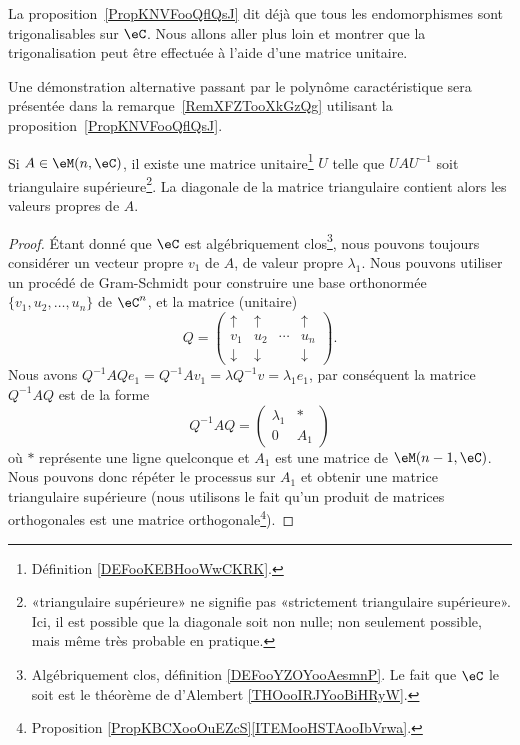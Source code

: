 La proposition~\ref{PropKNVFooQflQsJ} dit déjà que tous les endomorphismes sont trigonalisables sur \( \eC\). Nous allons aller plus loin et montrer que la trigonalisation peut être effectuée à l'aide d'une matrice unitaire.

Une démonstration alternative passant par le polynôme caractéristique sera présentée dans la remarque~\ref{RemXFZTooXkGzQg} utilisant la proposition~\ref{PropKNVFooQflQsJ}.
\begin{lemma}  \label{LemSchurComplHAftTq}
	Si \( A\in\eM(n,\eC)\), il existe une matrice unitaire\footnote{Définition \ref{DEFooKEBHooWwCKRK}.} \( U\) telle que \( UAU^{-1}\) soit triangulaire supérieure\footnote{«triangulaire supérieure» ne signifie pas «strictement triangulaire supérieure». Ici, il est possible que la diagonale soit non nulle; non seulement possible, mais même très probable en pratique.}. La diagonale de la matrice triangulaire contient alors les valeurs propres de \( A\).
\end{lemma}

\begin{proof}
	Étant donné que \( \eC\) est algébriquement clos\footnote{Algébriquement clos, définition \ref{DEFooYZOYooAesmnP}. Le fait que \( \eC\) le soit est le théorème de d'Alembert \ref{THOooIRJYooBiHRyW}.}, nous pouvons toujours considérer un vecteur propre \( v_1\) de \( A\), de valeur propre \( \lambda_1\). Nous pouvons utiliser un procédé de Gram-Schmidt pour construire une base orthonormée \( \{ v_1,u_2,\ldots, u_n \}\) de \( \eC^n\), et la matrice (unitaire)
	\begin{equation}
		Q=\begin{pmatrix}
			\uparrow   & \uparrow   &        & \uparrow   \\
			v_1        & u_2        & \cdots & u_n        \\
			\downarrow & \downarrow &        & \downarrow
		\end{pmatrix}.
	\end{equation}
	Nous avons \( Q^{-1}AQe_1=Q^{-1} Av_1=\lambda Q^{-1} v=\lambda_1 e_1\), par conséquent la matrice \( Q^{-1} AQ\) est de la forme
	\begin{equation}
		Q^{-1}AQ=\begin{pmatrix}
			\lambda_1 & *   \\
			0         & A_1
		\end{pmatrix}
	\end{equation}
	où \( *\) représente une ligne quelconque et \( A_1\) est une matrice de \( \eM(n-1,\eC)\). Nous pouvons donc répéter le processus sur \( A_1\) et obtenir une matrice triangulaire supérieure (nous utilisons le fait qu'un produit de matrices orthogonales est une matrice orthogonale\footnote{Proposition \ref{PropKBCXooOuEZcS}\ref{ITEMooHSTAooIbVrwa}.}).
\end{proof}

